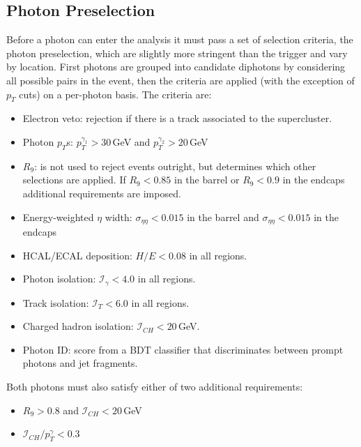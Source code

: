 \subsection{Photon Preselection}
Before a photon can enter the analysis it must pass a set of selection criteria, the photon preselection, which are slightly more stringent than the trigger and vary by location. First photons are grouped into candidate diphotons by considering all possible pairs in the event, then the criteria are applied (with the exception of $p_{T}$ cuts) on a per-photon basis.
The criteria are:
\begin{itemize}[leftmargin=.5in,noitemsep]
    \item Electron veto: rejection if there is a track associated to the supercluster.
    \item Photon $p_{T}$s: $p_{T}^{\gamma_1} > 30$\,GeV and $p_{T}^{\gamma_2} > 20$\,GeV
    \item $R_{9}$: is not used to reject events outright, but determines which other selections are applied. If $R_{9} < 0.85$ in the barrel or $R_{9} < 0.9$ in the endcaps additional requirements are imposed. 
    \item Energy-weighted $\eta$ width: $\sigma_{\eta\eta} < 0.015$ in the barrel and $\sigma_{\eta\eta} < 0.015$ in the endcaps
    \item HCAL/ECAL deposition: $H/E < 0.08$ in all regions.
    \item Photon isolation: $\mathcal{I}_{\gamma} < 4.0$ in all regions. 
    \item Track isolation: $\mathcal{I}_{T} < 6.0$ in all regions.
    \item Charged hadron isolation: $\mathcal{I}_{CH} < 20$\,GeV.
    \item Photon ID: score from a BDT classifier that discriminates between prompt photons and jet fragments.
\end{itemize}
Both photons must also satisfy either of two additional requirements:
\begin{itemize}[leftmargin=.5in,noitemsep]
    \item $R_{9} > 0.8$ and $\mathcal{I}_{CH} < 20$\,GeV
    \item $\mathcal{I}_{CH}/p_{T}^{\gamma} < 0.3$
\end{itemize}


